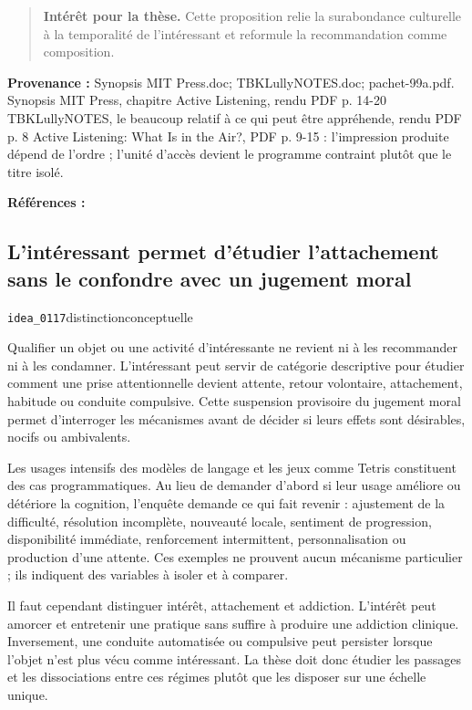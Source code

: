 \documentclass[10pt,a4paper]{article}
\begin{document}
\begin{quote}
\textbf{Intérêt pour la thèse.} Cette proposition relie la surabondance culturelle à la temporalité de l'intéressant et reformule la recommandation comme composition.
\end{quote}
{\footnotesize\color{metadata}\textbf{Provenance :} Synopsis MIT Press.doc; TBKLullyNOTES.doc; pachet-99a.pdf. Synopsis MIT Press, chapitre Active Listening, rendu PDF p. 14-20 TBKLullyNOTES, le beaucoup relatif à ce qui peut être appréhende, rendu PDF p. 8 Active Listening: What Is in the Air?, PDF p. 9-15 : l'impression produite dépend de l'ordre ; l'unité d'accès devient le programme contraint plutôt que le titre isolé.\par}
{\footnotesize\color{metadata}\textbf{Références :} \parencite{pachet1999active}\par}

\subsection{L'intéressant permet d'étudier l'attachement sans le confondre avec un jugement moral}
{\small\color{metadata} \texttt{idea\_0117}\quad\textbullet\quad distinction\quad\textbullet\quad conceptuelle\par}

Qualifier un objet ou une activité d'intéressante ne revient ni à les recommander ni à les condamner. L'intéressant peut servir de catégorie descriptive pour étudier comment une prise attentionnelle devient attente, retour volontaire, attachement, habitude ou conduite compulsive. Cette suspension provisoire du jugement moral permet d'interroger les mécanismes avant de décider si leurs effets sont désirables, nocifs ou ambivalents.

Les usages intensifs des modèles de langage et les jeux comme Tetris constituent des cas programmatiques. Au lieu de demander d'abord si leur usage améliore ou détériore la cognition, l'enquête demande ce qui fait revenir : ajustement de la difficulté, résolution incomplète, nouveauté locale, sentiment de progression, disponibilité immédiate, renforcement intermittent, personnalisation ou production d'une attente. Ces exemples ne prouvent aucun mécanisme particulier ; ils indiquent des variables à isoler et à comparer.

Il faut cependant distinguer intérêt, attachement et addiction. L'intérêt peut amorcer et entretenir une pratique sans suffire à produire une addiction clinique. Inversement, une conduite automatisée ou compulsive peut persister lorsque l'objet n'est plus vécu comme intéressant. La thèse doit donc étudier les passages et les dissociations entre ces régimes plutôt que les disposer sur une échelle unique.
\end{document}
